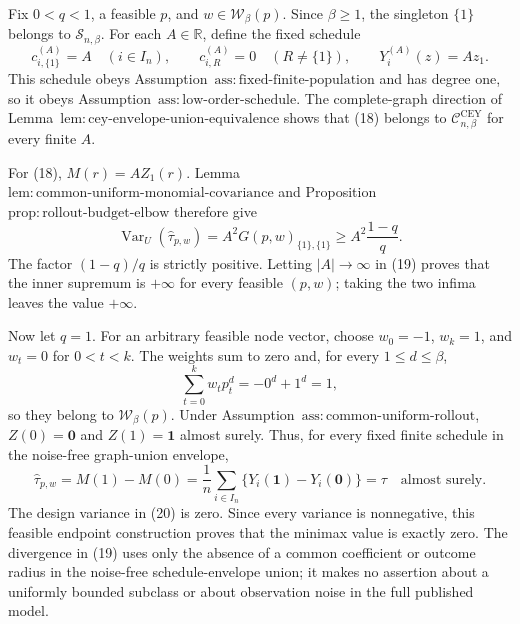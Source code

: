 Fix \(0<q<1\), a feasible \(p\), and \(w\in\mathcal W_\beta(p)\).  Since \(\beta\ge1\), the singleton \(\{1\}\) belongs to \(\mathcal S_{n,\beta}\).  For each \(A\in\mathbb R\), define the fixed schedule
\[
c^{(A)}_{i,\{1\}}=A\quad(i\in I_n),
\qquad
c^{(A)}_{i,R}=0\quad(R\ne\{1\}),
\qquad
Y_i^{(A)}(z)=Az_1.
\tag{18}
\]
This schedule obeys Assumption~\(\mathrm{ass{:}fixed\text{-}finite\text{-}population}\) and has degree one, so it obeys Assumption~\(\mathrm{ass{:}low\text{-}order\text{-}schedule}\).  The complete-graph direction of Lemma~\(\mathrm{lem{:}cey\text{-}envelope\text{-}union\text{-}equivalence}\) shows that (18) belongs to \(\mathcal C^{\mathrm{CEY}}_{n,\beta}\) for every finite \(A\).

For (18), \(M(r)=AZ_1(r)\).  Lemma~\(\mathrm{lem{:}common\text{-}uniform\text{-}monomial\text{-}covariance}\) and Proposition~\(\mathrm{prop{:}rollout\text{-}budget\text{-}elbow}\) therefore give
\[
\operatorname{Var}_U(\widehat\tau_{p,w})
=A^2G(p,w)_{\{1\},\{1\}}
\ge A^2\frac{1-q}{q}.
\tag{19}
\]
The factor \((1-q)/q\) is strictly positive.  Letting \(|A|\to\infty\) in (19) proves that the inner supremum is \(+\infty\) for every feasible \((p,w)\); taking the two infima leaves the value \(+\infty\).

Now let \(q=1\).  For an arbitrary feasible node vector, choose \(w_0=-1\), \(w_k=1\), and \(w_t=0\) for \(0<t<k\).  The weights sum to zero and, for every \(1\le d\le\beta\),
\[
\sum_{t=0}^kw_tp_t^d=-0^d+1^d=1,
\]
so they belong to \(\mathcal W_\beta(p)\).  Under Assumption~\(\mathrm{ass{:}common\text{-}uniform\text{-}rollout}\), \(Z(0)=\mathbf0\) and \(Z(1)=\mathbf1\) almost surely.  Thus, for every fixed finite schedule in the noise-free graph-union envelope,
\[
\widehat\tau_{p,w}
=M(1)-M(0)
=\frac1n\sum_{i\in I_n}\{Y_i(\mathbf1)-Y_i(\mathbf0)\}
=\tau
\quad\text{almost surely}.
\tag{20}
\]
The design variance in (20) is zero.  Since every variance is nonnegative, this feasible endpoint construction proves that the minimax value is exactly zero.  The divergence in (19) uses only the absence of a common coefficient or outcome radius in the noise-free schedule-envelope union; it makes no assertion about a uniformly bounded subclass or about observation noise in the full published model.